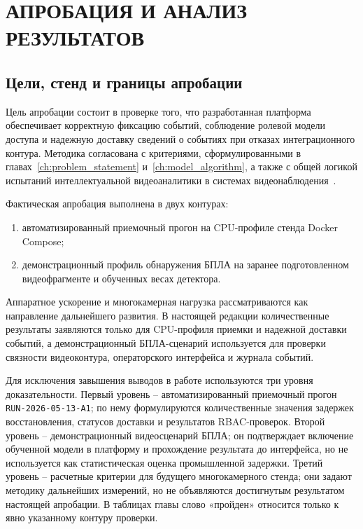 \chapter{АПРОБАЦИЯ И АНАЛИЗ РЕЗУЛЬТАТОВ}
\label{ch:approbation}

\section{Цели, стенд и границы апробации}

Цель апробации состоит в проверке того, что разработанная платформа обеспечивает корректную фиксацию событий, соблюдение ролевой модели доступа и надежную доставку сведений о событиях при отказах интеграционного контура. Методика согласована с критериями, сформулированными в главах~\ref{ch:problem_statement} и~\ref{ch:model_algorithm}, а также с общей логикой испытаний интеллектуальной видеоаналитики в системах видеонаблюдения~\cite{iec_62676_4_2025,iec_62676_6_2026}.

Фактическая апробация выполнена в двух контурах:
\begin{enumerate}
    \item автоматизированный приемочный прогон на CPU-профиле стенда Docker Compose;
    \item демонстрационный профиль обнаружения БПЛА на заранее подготовленном видеофрагменте и обученных весах детектора.
\end{enumerate}

Аппаратное ускорение и многокамерная нагрузка рассматриваются как направление дальнейшего развития. В настоящей редакции количественные результаты заявляются только для CPU-профиля приемки и надежной доставки событий, а демонстрационный БПЛА-сценарий используется для проверки связности видеоконтура, операторского интерфейса и журнала событий.

Для исключения завышения выводов в работе используются три уровня доказательности. Первый уровень -- автоматизированный приемочный прогон \texttt{RUN-2026-05-13-A1}; по нему формулируются количественные значения задержек восстановления, статусов доставки и результатов RBAC-проверок. Второй уровень -- демонстрационный видеосценарий БПЛА; он подтверждает включение обученной модели в платформу и прохождение результата до интерфейса, но не используется как статистическая оценка промышленной задержки. Третий уровень -- расчетные критерии для будущего многокамерного стенда; они задают методику дальнейших измерений, но не объявляются достигнутым результатом настоящей апробации. В таблицах главы слово «пройден» относится только к явно указанному контуру проверки.

